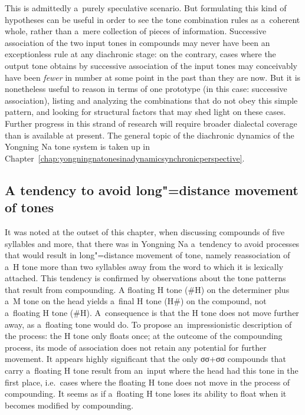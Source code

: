 This is admittedly a~purely speculative scenario. But formulating this kind of hypotheses can be useful in order to see the tone combination rules as a~coherent whole, rather than a~mere collection of pieces of information. Successive association of the two input tones in compounds may never have been an exceptionless rule at any {diachronic} stage: on the contrary, cases where the output tone obtains by successive association of the input tones may conceivably have been \textit{fewer} in number at some point in the past than they are now. But it is nonetheless useful to reason in terms of one prototype (in this case: successive association), listing and analyzing the combinations that do not obey this simple pattern, and looking for {structural} factors that may shed light on these cases. Further progress in this strand of research will require broader dialectal coverage than is available at present. The general topic of the {diachronic} dynamics of the Yongning Na tone system is taken up in Chapter~\ref{chap:yongningnatonesinadynamicsynchronicperspective}.


\subsection{A tendency to avoid long"=distance movement of tones}
\label{sec:longdistancedispreferred}

It was noted at the outset of this chapter, when discussing compounds
of five syllables and more, that there was in Yongning Na a~tendency to avoid
processes that would result in long"=distance movement of tone, namely
reassociation of a~H tone more than two syllables away from the word
to which it is lexically attached. This tendency is confirmed by
observations about the tone patterns that result from compounding. A
floating H tone (\#H) on the determiner plus a~M tone on the head
yields a~final H tone (H\#) on the compound, not a~floating H tone
(\#H). A~consequence is that the H tone does not move further away, as a~{floating} tone would do. To propose an~impressionistic description of
the process: the H tone only floats once; at the outcome of the
compounding process, its mode of association does not retain any
potential for further movement. It appears highly significant that the
only σσ+σσ compounds that carry a~floating H tone result from an~input
where the head had this tone in the first place, i.e.\ cases where the
floating H tone does not move in the process of compounding. It seems
as if a~floating H tone loses its ability to {float} when it becomes
modified by compounding.

